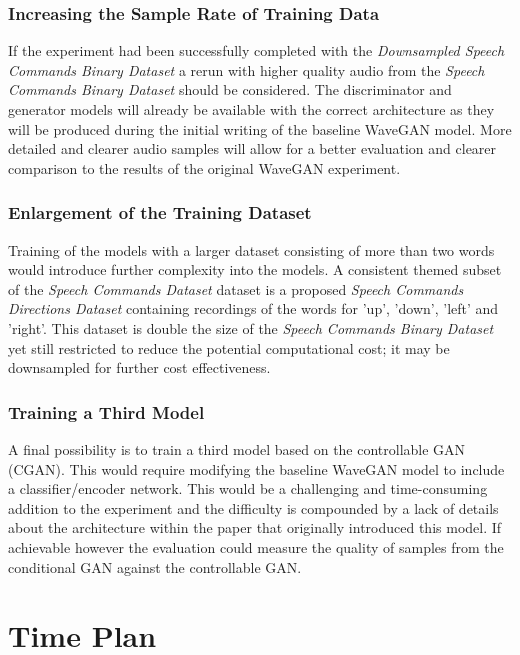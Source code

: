 \documentclass[a4paper, dvipsnames, titlepage]{article}
\begin{document}
\subsubsection{Increasing the Sample Rate of Training Data}

If the experiment had been successfully completed with the \textit{Downsampled Speech Commands Binary Dataset} a rerun with higher quality audio from the \textit{Speech Commands Binary Dataset} should be considered.
The discriminator and generator models will already be available with the correct architecture as they will be produced during the initial writing of the baseline WaveGAN model.
More detailed and clearer audio samples will allow for a better evaluation and clearer comparison to the results of the original WaveGAN experiment.

\subsubsection{Enlargement of the Training Dataset}

Training of the models with a larger dataset consisting of more than two words would introduce further complexity into the models.
A consistent themed subset of the \textit{Speech Commands Dataset} dataset is a proposed \textit{Speech Commands Directions Dataset} containing recordings of the words for 'up', 'down', 'left' and 'right'.
This dataset is double the size of the \textit{Speech Commands Binary Dataset} yet still restricted to reduce the potential computational cost; it may be downsampled for further cost effectiveness.

\subsubsection{Training a Third Model}

A final possibility is to train a third model based on the controllable GAN (CGAN).
This would require modifying the baseline WaveGAN model to include a classifier/encoder network.
This would be a challenging and time-consuming addition to the experiment and the difficulty is compounded by a lack of details about the architecture within the paper that originally introduced this model.
If achievable however the evaluation could measure the quality of samples from the conditional GAN against the controllable GAN.

\newpage

\section{Time Plan}
\end{document}
